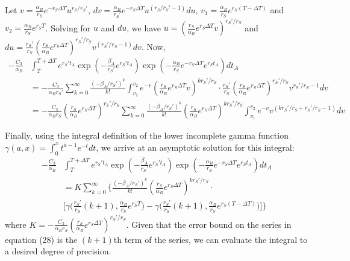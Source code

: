 \documentclass{article}
\begin{document}
Let $v = \frac{\alpha_B}{r_S} e^{-r_S \Delta T} u^{r_S/r_S'}$, $dv = \frac{\alpha_B}{r_S'} e^{-r_S \Delta T} u^{(r_S/r_S' - 1)} du$, $v_1 = \frac{\alpha_B}{r_S} e^{r_S (T-\Delta T)}$ and $v_2 = \frac{\alpha_B}{r_S} e^{r_S T}$.  Solving for $u$ and $du$, we have $u=(\frac{r_S}{\alpha_B} e^{r_S \Delta T} v)^{r_S'/r_S}$ and $du = \frac{r_S'}{r_S}(\frac{r_S}{\alpha_B} e^{r_S \Delta T})^{r_S'/r_S} v^{(r_S'/r_S-1)}dv$.  Now,
\begin{equation}
\begin{split}
-\frac{C_3}{\alpha_B} & \int_T^{T+\Delta T} e^{r_S' t_A} \exp(-\frac{\beta_A}{r_S'} e^{r_S't_A}) \exp(-\frac{\alpha_B}{r_S} e^{-r_S \Delta T} e^{r_S t_A}) dt_A\\
& = -\frac{C_3}{\alpha_B r_S'} \sum_{k=0}^{\infty} \frac{(-\beta_A/r_S')^k}{k!} \int_{v_1}^{v_2} e^{-v} (\frac{r_S}{\alpha_B} e^{r_S \Delta T} v)^{k r_S'/r_S} \cdot \frac{r_S'}{r_S} (\frac{r_S}{\alpha_B} e^{r_S \Delta T})^{r_S'/r_S} v^{r_S'/r_S-1} dv \\
& = -\frac{C_3}{\alpha_B r_S} (\frac{r_S}{\alpha_B} e^{r_S \Delta T})^{r_S'/r_S} \sum_{k=0}^{\infty} \frac{(-\beta_A/r_S')^k}{k!} (\frac{r_S}{\alpha_B} e^{r_S \Delta T})^{k r_S'/r_S} \int_{v_1}^{v_2} e^{-v} v^{(k r_S'/r_S + r_S'/r_S -1)} dv
\end{split}
\end{equation}

Finally, using the integral definition of the lower incomplete gamma function $\gamma(a,x) = \int_0^x t^{a-1} e^{-t} dt$, we arrive at an asymptotic solution for this integral:
\begin{equation}
\begin{split}
-\frac{C_3}{\alpha_B} & \int_T^{T+\Delta T} e^{r_S' t_A} \exp(-\frac{\beta_A}{r_S'} e^{r_S't_A}) \exp(-\frac{\alpha_B}{r_S} e^{-r_S \Delta T} e^{r_S t_A}) dt_A\\
& = K \sum_{k=0}^{\infty} \Bigg\{\frac{(-\beta_A/r_S')^k}{k!} (\frac{r_S}{\alpha_B}e^{r_S \Delta T})^{k r_S'/r_S} \cdot \\
& \Big[\gamma\big(\frac{r_S'}{r_S}(k+1),\frac{\alpha_B}{r_S} e^{r_S T}\big) - \gamma\big(\frac{r_S'}{r_S}(k+1),\frac{\alpha_B}{r_S} e^{r_S (T-\Delta T)}\big)\Big]\Bigg\}
\end{split}
\end{equation}
where $K = -\frac{C_3}{\alpha_B r_S} (\frac{r_S}{\alpha_B} e^{r_S \Delta T})^{r_S'/r_S} $.  Given that the error bound on the series in equation (28) is the $(k+1)$th term of the series, we can evaluate the integral to a desired degree of precision.
\end{document}

